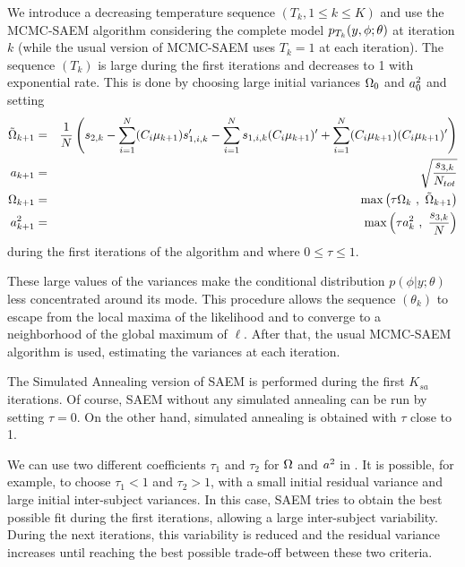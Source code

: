 We introduce a decreasing temperature sequence $(T_k, 1\leq k \leq K)$ and use the MCMC-SAEM algorithm considering the complete model $p_{T_k}(y,{\phi};\theta)$  at iteration $k$ (while the usual version of MCMC-SAEM uses $T_k=1$ at each iteration). The sequence $(T_k)$ is large during the first iterations and decreases to 1 with exponential rate. This is done by choosing large initial variances ${\Omega}_0$ and $a^2_0$ and setting
\begin{eqnarray}
 \tilde{\IIV}_{k+1} &=& \frac{1}{N} \left(s_{2,k}- \sum_{i=1}^N(\magi\mugkun)s_{1,i,k}^\prime -\sum_{i=1}^N s_{1,i,k}(\magi\mugkun)^\prime +\sum_{i=1}^N (\magi\mugkun)(\magi\mugkun)^\prime\right)  \\
\ag_{k+1} & = & \sqrt{ \frac{s_{3,k}}{N_{tot}} }\\
\IIV_{k+1} &=& \max\left( \tau \IIV_{k}  \ , \ \tilde{\IIV}_{k+1}  \right)  \label{tau1} \\
\ag^2_{k+1} & = &  \max\left( \tau \ag^2_{k} \ , \  \frac{s_{3,k}}{N} \right) \label{tau2}
\end{eqnarray}
during the first iterations of the algorithm and where $0\leq\tau\leq 1$.

These large values of the variances make the conditional distribution $p(\phi|y;\theta )$ less concentrated around its mode. This procedure allows the sequence $(\theta_k)$ to escape from the local maxima of the likelihood and to converge to a neighborhood of the global maximum of $\ell$. After that, the usual MCMC-SAEM algorithm is used, estimating the variances at each iteration.


 The Simulated Annealing version of SAEM is performed during the first $K_{sa}$ iterations. Of course, SAEM without any simulated annealing can be run by setting $\tau=0$. On the other hand, simulated annealing is obtained with $\tau$ close to 1.

 We can use two different coefficients $\tau_1$ and $\tau_2$ for ${\Omega}$ and $a^2$ in \monolix. It is possible, for example, to choose $\tau_1<1$ and $\tau_2>1$, with a small initial residual variance and large initial inter-subject variances. In this case, SAEM tries to obtain the best possible fit during the first iterations, allowing a large inter-subject variability. During the next iterations, this variability is reduced and the residual variance increases until reaching the best possible trade-off between these two criteria.

